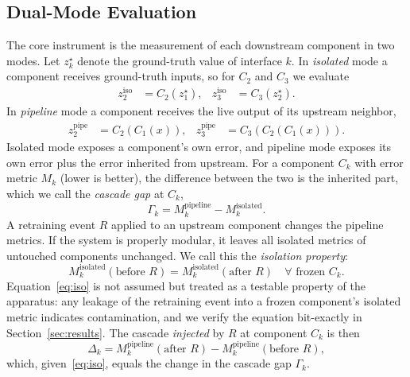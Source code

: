 \documentclass[conference]{IEEEtran}
\begin{document}
\subsection{Dual-Mode Evaluation}
The core instrument is the measurement of each downstream component in two
modes. Let $z_k^{\star}$ denote the ground-truth value of interface $k$. In
\emph{isolated} mode a component receives ground-truth inputs, so for $C_2$ and
$C_3$ we evaluate
\begin{align}
z_2^{\text{iso}} &= C_2(z_1^{\star}), &
z_3^{\text{iso}} &= C_3(z_2^{\star}).
\label{eq:iso-mode}
\end{align}
In \emph{pipeline} mode a component receives the live output of its upstream
neighbor,
\begin{align}
z_2^{\text{pipe}} &= C_2(C_1(x)), &
z_3^{\text{pipe}} &= C_3(C_2(C_1(x))).
\label{eq:pipe-mode}
\end{align}
Isolated mode exposes a component's own error, and pipeline mode exposes its own
error plus the error inherited from upstream. For a component $C_k$ with error
metric $M_k$ (lower is better), the difference between the two is the inherited
part, which we call the \emph{cascade gap} at $C_k$,
\begin{equation}
\Gamma_k = M_k^{\text{pipeline}} - M_k^{\text{isolated}}.
\label{eq:gap}
\end{equation}
A retraining event $R$ applied to an upstream component changes the pipeline
metrics. If the system is properly modular, it leaves all isolated metrics of
untouched components unchanged. We call this the \emph{isolation property}:
\begin{equation}
M_k^{\text{isolated}}(\text{before } R) = M_k^{\text{isolated}}(\text{after } R)
\quad \forall \text{ frozen } C_k.
\label{eq:iso}
\end{equation}
Equation~\eqref{eq:iso} is not assumed but treated as a testable property of
the apparatus: any leakage of the retraining event into a frozen component's
isolated metric indicates contamination, and we verify the equation bit-exactly
in Section~\ref{sec:results}. The cascade \emph{injected} by $R$ at component
$C_k$ is then
\begin{equation}
\Delta_k = M_k^{\text{pipeline}}(\text{after } R) - M_k^{\text{pipeline}}(\text{before } R),
\label{eq:inj}
\end{equation}
which, given~\eqref{eq:iso}, equals the change in the cascade gap $\Gamma_k$.
\end{document}
